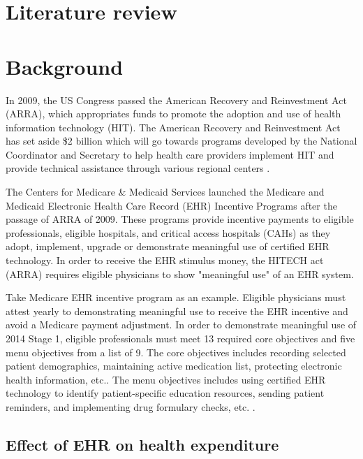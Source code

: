 \section{Literature review}

\section{Background}

In 2009, the US Congress passed the American Recovery and Reinvestment Act (ARRA), which appropriates funds to promote the adoption and use of health information technology (HIT). The American Recovery and Reinvestment Act has set aside \$2 billion which will go towards programs developed by the National Coordinator and Secretary to help health care providers implement HIT and provide technical assistance through various regional centers \citep{hhs_recovery}.

The Centers for Medicare \& Medicaid Services launched the Medicare and Medicaid Electronic Health Care Record (EHR) Incentive Programs after the passage of ARRA of 2009. These programs provide incentive payments to eligible professionals, eligible hospitals, and critical access hospitals (CAHs) as they adopt, implement, upgrade or demonstrate meaningful use of certified EHR technology. In order to receive the EHR stimulus money, the HITECH act (ARRA) requires eligible physicians to show "meaningful use" of an EHR system.

Take Medicare EHR incentive program as an example. Eligible physicians must attest yearly to demonstrating meaningful use to receive the EHR incentive and avoid a Medicare payment adjustment. In order to demonstrate meaningful use of 2014 Stage 1, eligible professionals must meet 13 required core objectives and five menu objectives from a list of 9. The core objectives includes recording selected patient demographics, maintaining active medication list, protecting electronic health information, etc.. The menu objectives includes using certified EHR technology to identify patient-specific education resources, sending patient reminders, and implementing drug formulary checks, etc. \citep{stage1}.

\subsection{Effect of EHR on health expenditure}

